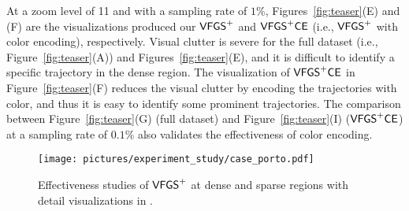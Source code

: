 At a zoom level of 11 and with a sampling rate of $1\%$, Figures~\ref{fig:teaser}(E) and (F) are the visualizations produced our $\mathsf{VFGS}^{+}$ and $\mathsf{VFGS}^{+}\mathsf{CE}$ (i.e., $\mathsf{VFGS}^{+}$ with color encoding), respectively.
Visual clutter is severe for the full dataset (i.e., Figure~\ref{fig:teaser}(A)) and Figures~\ref{fig:teaser}(E), and it is difficult to identify a specific trajectory in the dense region. The visualization of $\mathsf{VFGS}^{+}\mathsf{CE}$ in Figure~\ref{fig:teaser}(F) reduces the visual clutter by encoding the trajectories with color, and thus it is easy to identify some prominent trajectories. The comparison between Figure~\ref{fig:teaser}(G) (full dataset) and Figure~\ref{fig:teaser}(I)  ($\mathsf{VFGS}^{+}\mathsf{CE}$) at a sampling rate of $0.1\%$ also validates the effectiveness of color encoding.

\begin{figure*}[t]
	\centering
	\texttt{[image: pictures/experiment\_study/case\_porto.pdf]}
	\vspace{-3mm}
	\caption{Effectiveness studies of $\mathsf{VFGS}^{+}$ at dense and sparse regions with detail visualizations in \pt{}.}
	\label{fig:porto}
	\vspace{-2mm}
\end{figure*}

